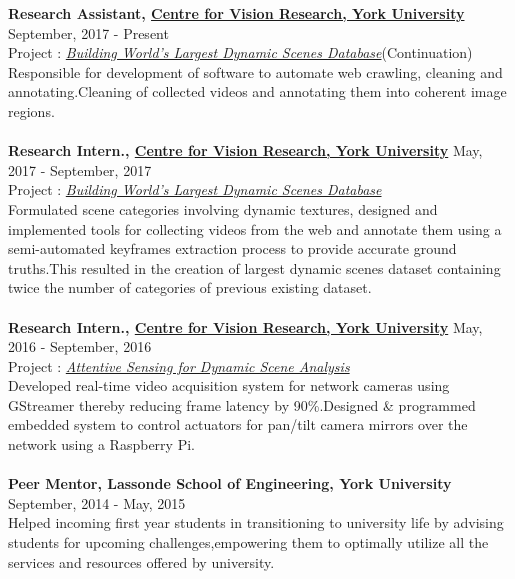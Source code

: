 \documentclass[margin, centered]{res}
\begin{document}
\begin{resume}
		\textbf{Research Assistant,  \href{http://cvr.yorku.ca/} { Centre for Vision Research, York University}} 
		\hfill September, 2017 - Present \\
		Project : \href{http://www.lassondeundergraduateresearch.com/electricalandcomputer#/new-page-s6yt8/}{\emph{Building World's Largest Dynamic Scenes Database}}(Continuation)\\
		Responsible for development of software to automate web crawling, cleaning and annotating.Cleaning of collected videos and annotating them into coherent image regions.
		\\\\
		\textbf{Research Intern.,  \href{http://cvr.yorku.ca/} { Centre for Vision Research, York University}} 
		\hfill May, 2017 - September, 2017 \\
		Project : \href{http://www.lassondeundergraduateresearch.com/electricalandcomputer#/new-page-s6yt8/}{\emph{Building World's Largest Dynamic Scenes Database}}\\
		Formulated scene categories involving dynamic textures, designed and implemented tools for collecting videos from the web and annotate them using a semi-automated keyframes extraction process to provide accurate ground truths.This resulted in the creation of largest dynamic scenes dataset containing twice the number of categories of previous existing dataset. 
		\\ \\
		\textbf{Research Intern.,  \href{http://cvr.yorku.ca/} { Centre for Vision Research, York University}} 
		\hfill May, 2016 - September, 2016 \\
		Project : \href{http://www.lassondeundergraduateresearch.com/lassonde#/amanpreet-walia/}{\emph{Attentive Sensing for Dynamic Scene Analysis}}\\ 
		Developed real-time video acquisition system for network cameras using GStreamer thereby reducing frame latency by 90\%.Designed \& programmed embedded system to control actuators for pan/tilt camera mirrors over the network using a Raspberry Pi.
		\\\\
		\textbf{Peer Mentor,  Lassonde School of Engineering, York University}  \hfill September, 2014 - May, 2015 \\
		Helped incoming first year students in transitioning to university life by advising students for upcoming challenges,empowering them to optimally utilize all the services and resources offered by university.

\end{resume}
\end{document}
